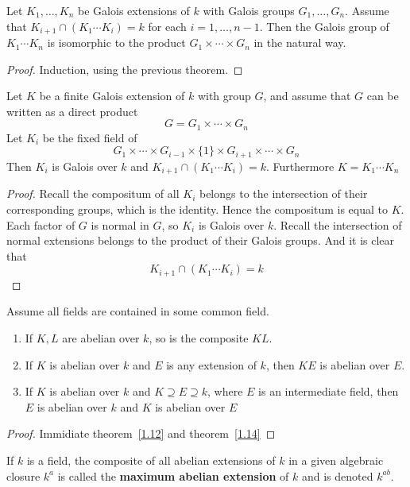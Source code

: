 \begin{corollary}
    Let $K_1,\ldots,K_n$ be Galois extensions of $k$ with Galois groups $G_1,\ldots,G_n$. Assume that $K_{i+1}\cap (K_1\cdots K_i) = k$ for each $i=1,\ldots,n-1$. Then the Galois group of $K_1\cdots K_n$ is isomorphic to the product $G_1\times \cdots\times G_n$ in the natural way.
    \begin{proof}
        Induction, using the previous theorem.
    \end{proof}
\end{corollary}
\begin{corollary}
    Let $K$ be a finite Galois extension of $k$ with group $G$, and assume that $G$ can be written as a direct product \[
        G = G_1\times\cdots\times G_n    
    \]
    Let $K_i$ be the fixed field of \[
        G_1\times \cdots \times G_{i-1}\times \{1\}\times G_{i+1}\times \cdots\times G_n    
    \]
    Then $K_i$ is Galois over $k$ and $K_{i+1}\cap (K_1\cdots K_i) = k$. Furthermore $K = K_1\cdots K_n$
    \begin{proof}
        Recall the compositum of all $K_i$ belongs to the intersection of their corresponding groups, which is the identity. Hence the compositum is equal to $K$. Each factor of $G$ is normal in $G$, so $K_i$ is Galois over $k$. Recall the intersection of normal extensions belongs to the product of their Galois groups. And it is clear that \[
            K_{i+1}\cap (K_1\cdots K_i) = k    
        \]
    \end{proof}
\end{corollary}
\begin{theorem}
    Assume all fields are contained in some common field.\begin{enumerate}
        \item If $K,L$ are abelian over $k$, so is the composite $KL$.
        \item If $K$ is abelian over $k$ and $E$ is any extension of $k$, then $KE$ is abelian over $E$.
        \item If $K$ is abelian over $k$ and $K\supseteq E\supseteq k$, where $E$ is an intermediate field, then $E$ is abelian over $k$ and $K$ is abelian over $E$
    \end{enumerate}
    \begin{proof}
        Immidiate theorem~\ref{1.12} and theorem~\ref{1.14}
    \end{proof}
\end{theorem}
\begin{definition}
    If $k$ is a field, the composite of all abelian extensions of $k$ in a given algebraic closure $k^a$ is called the \textbf{maximum abelian extension} of $k$ and is denoted $k^{ab}$.
\end{definition}

